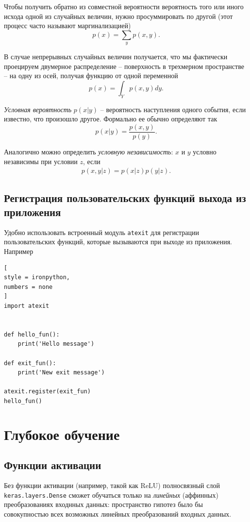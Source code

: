 \documentclass[%
	11pt,
	a4paper,
	utf8,
		]{article}
\begin{document}
Чтобы получить обратно из совместной вероятности вероятность того или иного исхода одной из случайных величин, нужно просуммировать по другой (этот процесс часто называют маргинализацией)
$$
p(x) = \sum_{y} p(x, y).
$$

В случае непрерывных случайных величин получается, что мы фактически проецируем двумерное распределение -- поверхность в трехмерном пространстве -- на одну из осей, получая функцию от одной переменной
$$
p(x) = \int_{Y} p(x, y)dy.
$$

\emph{Условная вероятность} $ p(x | y) $ -- вероятность наступления одного события, если известно, что произошло другое. Формально ее обычно определяют так
$$
p(x | y) = \dfrac{ p(x, y) }{p(y)}.
$$

Аналогично можно определить \emph{условную независимость}: $ x $ и $ y $ условно независимы при условии $ z $, если
\begin{align*}
	p(x, y | z) = p(x | z)p(y | z).
\end{align*}

\subsection{Регистрация пользовательских функций выхода из приложения}

Удобно использовать встроенный модуль \texttt{atexit} для регистрации пользовательских функций, которые вызываются при выходе из приложения. Например
\begin{lstlisting}[
style = ironpython,
numbers = none	
]
import atexit


def hello_fun():
    print('Hello message')

def exit_fun():
    print('New exit message')

atexit.register(exit_fun)
hello_fun()
\end{lstlisting}


\section{Глубокое обучение}

\subsection{Функции активации}

Без функции активации (например, такой как ReLU) полносвязный слой \texttt{keras.layers.Dense} сможет обучаться только на \emph{линейных} (аффинных) преобразованиях входнных данных: пространство гипотез было бы совокупностью всех возможных линейных преобразований входных данных.
\end{document}
